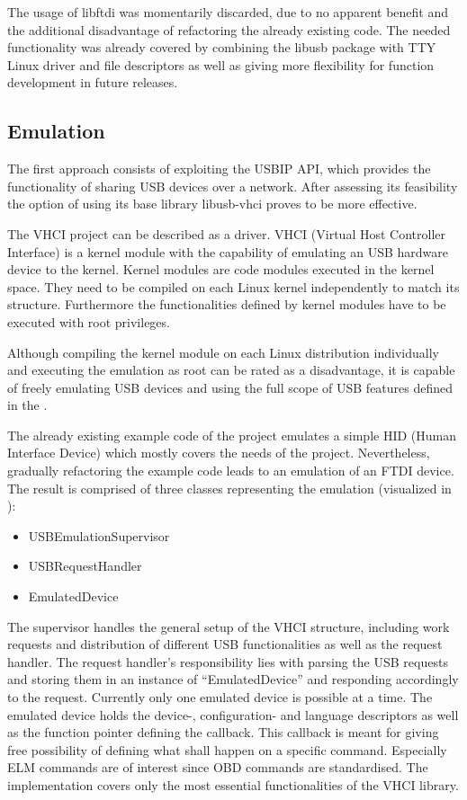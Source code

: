 The usage of libftdi was momentarily discarded, due to no apparent benefit and the additional disadvantage of refactoring the already existing 
code. The needed functionality was already covered by combining the libusb package with TTY Linux driver and file descriptors as well as giving more
flexibility for function development in future releases.

\subsection{Emulation}
\label{sec:emulation}
The first approach consists of exploiting the USBIP API, which provides the functionality of sharing USB devices over a network. After 
assessing its feasibility the option of using its base library libusb-vhci proves to be more effective.

The VHCI project can be described as a driver. VHCI \cite{VHCI} (Virtual Host Controller Interface) is a kernel module with the capability of emulating an 
USB hardware device to the kernel. Kernel modules are code modules executed in the kernel space. They need to be compiled on each Linux kernel 
independently to match its structure. Furthermore the functionalities defined by kernel modules have to be executed with root privileges.

Although compiling the kernel module on each Linux distribution individually and executing the emulation as root can be rated as a disadvantage,
it is capable of freely emulating USB devices and using the full scope of USB features defined in the  \cite{USB}. 

The already existing example code of the project emulates a simple HID (Human Interface Device) which mostly covers the needs of the project. 
Nevertheless, gradually refactoring the example code leads to an emulation of an FTDI device. The result is comprised of three classes 
representing the emulation (visualized in ):

\begin{itemize}
 \item USBEmulationSupervisor
 \item USBRequestHandler
 \item EmulatedDevice
\end{itemize}

The supervisor handles the general setup of the VHCI structure, including work requests and distribution of different USB functionalities as 
well as the request handler. The request handler’s responsibility lies with parsing the USB requests and storing them in an instance of 
“EmulatedDevice” and responding accordingly to the request. Currently only one emulated device is possible at a time. The emulated device holds 
the device-, configuration- and language descriptors as well as the function pointer defining the callback. This callback is meant for giving 
free possibility of defining what shall happen on a specific command. Especially ELM commands are of interest since OBD commands are 
standardised. The implementation covers only the most essential functionalities of the VHCI library.

